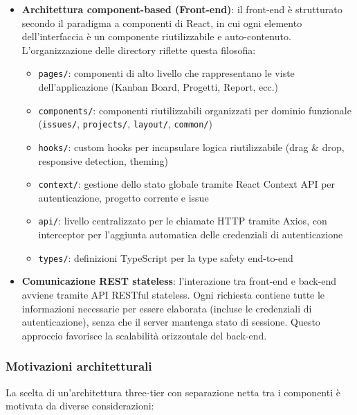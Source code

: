 \begin{itemize}[leftmargin=1.1em]
\item \textbf{Architettura component-based (Front-end)}: il front-end è strutturato secondo il paradigma a componenti di React, in cui ogni elemento dell'interfaccia è un componente riutilizzabile e auto-contenuto. L'organizzazione delle directory riflette questa filosofia:
  \begin{itemize}
  \item \texttt{pages/}: componenti di alto livello che rappresentano le viste dell'applicazione (Kanban Board, Progetti, Report, ecc.)
  \item \texttt{components/}: componenti riutilizzabili organizzati per dominio funzionale (\texttt{issues/}, \texttt{projects/}, \texttt{layout/}, \texttt{common/})
  \item \texttt{hooks/}: custom hooks per incapsulare logica riutilizzabile (drag \& drop, responsive detection, theming)
  \item \texttt{context/}: gestione dello stato globale tramite React Context API per autenticazione, progetto corrente e issue
  \item \texttt{api/}: livello centralizzato per le chiamate HTTP tramite Axios, con interceptor per l'aggiunta automatica delle credenziali di autenticazione
  \item \texttt{types/}: definizioni TypeScript per la type safety end-to-end
  \end{itemize}

\item \textbf{Comunicazione REST stateless}: l'interazione tra front-end e back-end avviene tramite API RESTful stateless. Ogni richiesta contiene tutte le informazioni necessarie per essere elaborata (incluse le credenziali di autenticazione), senza che il server mantenga stato di sessione. Questo approccio favorisce la scalabilit\`a orizzontale del back-end.

\end{itemize}
\newpage
\subsubsection{Motivazioni architetturali}
\label{subsec:motivazioni-architetturali}

La scelta di un'architettura three-tier con separazione netta tra i componenti è motivata da diverse considerazioni:

